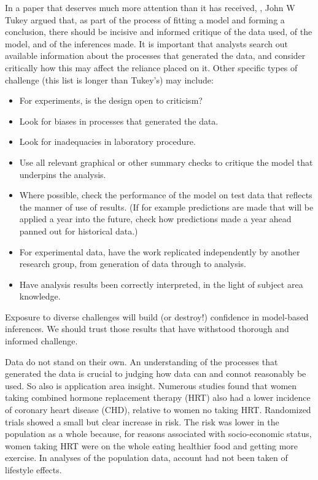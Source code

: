 In a paper that deserves much more attention than it has received,
\citep{tukey_1997}, John W Tukey
argued that, as part of the process of fitting a model and forming a
conclusion, there should be  incisive and informed critique of the data
used, of the model, and of the inferences made. It is important that
analysts search out available information about the processes that
generated the data, and consider critically how this may affect the
reliance placed on it. Other specific types of challenge (this list is
longer than Tukey's) may include:
\begin{itemize}
\tightlist
\item For experiments, is the design open to criticism?
\item Look for biases in processes that generated the data.
\item Look for inadequacies in laboratory procedure.
\item Use all relevant graphical or other summary checks to
critique the model that underpins the analysis.
\item Where possible, check the performance of the model on
test data that reflects the manner of use of results.
(If for example predictions are made that will be applied a
year into the future, check how predictions made a year
ahead panned out for historical data.)
\item For experimental data, have the work replicated
independently by another research group, from generation of
data through to analysis.
\item Have analysis results been correctly interpreted,
in the light of subject area knowledge.
\end{itemize}
Exposure to diverse challenges will build (or destroy!) confidence
in model-based inferences. We should trust those results that have
withstood thorough and informed challenge. 

Data do not stand on their own. An understanding of the processes
that generated the data is crucial to judging how data can and connot
reasonably be used.  So also is application area insight. Numerous
studies found that women taking combined hormone replacement therapy
(HRT) also had a lower incidence of coronary heart disease (CHD),
relative to women no taking HRT.  Randomized trials showed a small
but clear increase in risk.  The risk was lower in the population
as a whole because, for reasons associated with socio-economic status,
women taking HRT were on the whole eating healthier food and getting
more exercise.  In analyses of the population data, account had not
been taken of lifestyle effects.

